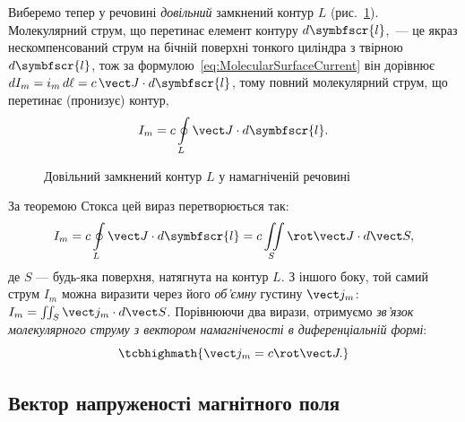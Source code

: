 Виберемо тепер у речовині \emph{довільний} замкнений контур $L$ (рис.~\ref{pic:Jloop}). Молекулярний струм, що перетинає елемент контуру $d\symbfscr{l}$,~--- це якраз нескомпенсований струм на бічній поверхні тонкого циліндра з твірною $d\symbfscr{l}$, тож за формулою~\eqref{eq:MolecularSurfaceCurrent} він дорівнює $dI_m = i_m\, d\ell = c\,\vect J\cdot d\symbfscr{l}$, тому повний молекулярний струм, що
перетинає (пронизує) контур,
\begin{equation}\label{eq:CirculationJ}
	I_m = c\oint\limits_L \vect J\cdot d\symbfscr{l}.
\end{equation}

\begin{figure}\centering
	\caption{Довільний замкнений контур $L$ у намагніченій речовині\label{pic:Jloop}}
\end{figure}

За теоремою Стокса цей вираз перетворюється так:
\begin{equation*}
	I_m = c\oint\limits_L \vect J\cdot d\symbfscr{l} = c\iint\limits_S \rot\vect J\cdot d\vect S,
\end{equation*}
де $S$ --- будь-яка поверхня, натягнута на контур $L$. З іншого боку, той самий струм $I_m$ можна виразити через його \emph{об'ємну} густину
$\vect j_m$: $I_m = \iint_S \vect j_m\cdot d\vect S$. Порівнюючи два вирази, отримуємо \emph{зв'язок молекулярного струму з вектором
	намагніченості в диференціальній формі}:
\begin{equation}\label{eq:MolecularCurrentDensity}
	\tcbhighmath{
		\vect j_m = c\rot\vect J.
	}
\end{equation}

\subsection*{Вектор напруженості магнітного поля}

